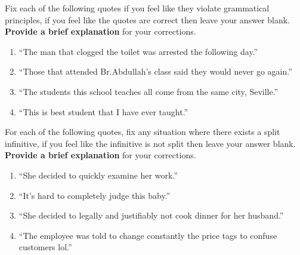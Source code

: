 \documentclass[12pt]{article} %
\begin{document}
\begin{qstn}[2]
  Fix each of the following quotes if you feel like they violate grammatical principles, if you feel like the quotes
  are correct then leave your answer blank. \textbf{Provide a brief explanation} for your corrections.
  
  \begin{enumerate}
    \item ``The man that clogged the toilet was arrested the following day.''
      \vspace*{4cm}

    \item ``Those that attended Br.Abdullah's class said they would never go again.''
      \vspace*{4cm}
      
    \item ``The students this school teaches all come from the same city, Seville.''
      \vspace*{4cm}

    \item ``This is best student that I have ever taught.''
      \vspace*{4cm}

  \end{enumerate}
  
\end{qstn}

\begin{qstn}[3]
  For each of the following quotes, fix any situation where there exists a split infinitive, if you feel like the infinitive
  is not split then leave your answer blank. \textbf{Provide a brief explanation} for your corrections.

  \begin{enumerate}
    \item ``She decided to quickly examine her work.''
      \vspace*{4cm}

    \item ``It's hard to completely judge this baby.''
      \vspace*{4cm}
      
    \item ``She decided to legally and justifiably not cook dinner for her husband.''
      \vspace*{4cm}

     \item ``The employee was told to change constantly the price tags to confuse customers lol.''
      \vspace*{4cm}

  \end{enumerate}
\end{qstn}
\end{document}
